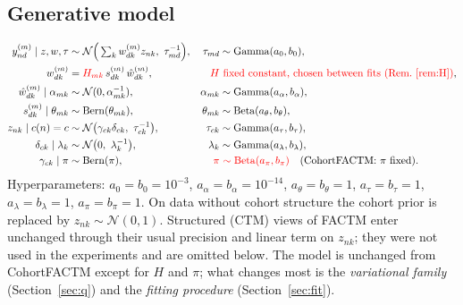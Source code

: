 \documentclass[11pt,a4paper]{article}
\newcommand{\new}[1]{{\color{red}#1}}
\newcommand{\N}{\mathcal{N}}
\newcommand{\Bern}{\mathrm{Bern}}
\newcommand{\Betad}{\mathrm{Beta}}
\newcommand{\Gam}{\mathrm{Gamma}}
\newcommand{\wh}{\hat w}
\theoremstyle{definition}
\theoremstyle{remark}
\begin{document}
\subsection{Generative model}
\begin{align}
y^{(m)}_{nd}\mid z,w,\tau &\sim \N\Big(\textstyle\sum_{k} w^{(m)}_{dk}z_{nk},\ \tau_{md}^{-1}\Big), &\tau_{md}&\sim\Gam(a_0,b_0),\label{eq:lik}\\
w^{(m)}_{dk} &= \new{H_{mk}}\, s^{(m)}_{dk}\,\wh^{(m)}_{dk}, &\new{H}&\ \new{\text{fixed constant, chosen between fits (Rem.~\ref{rem:H})}},\label{eq:w}\\
\wh^{(m)}_{dk}\mid\alpha_{mk}&\sim\N(0,\alpha_{mk}^{-1}), &\alpha_{mk}&\sim\Gam(a_\alpha,b_\alpha),\\
s^{(m)}_{dk}\mid\theta_{mk}&\sim\Bern(\theta_{mk}), &\theta_{mk}&\sim\Betad(a_\theta,b_\theta),\\
z_{nk}\mid c(n)=c &\sim \N\big(\gamma_{ck}\delta_{ck},\ \tau_{ck}^{-1}\big), &\tau_{ck}&\sim\Gam(a_\tau,b_\tau),\label{eq:z}\\
\delta_{ck}\mid\lambda_k &\sim \N\big(0,\ \lambda_k^{-1}\big), &\lambda_k&\sim\Gam(a_\lambda,b_\lambda),\label{eq:delta}\\
\gamma_{ck}\mid\pi &\sim\Bern(\pi), &\new{\pi}&\new{\ \sim\Betad(a_\pi,b_\pi)}\quad(\text{CohortFACTM: }\pi\text{ fixed}).\label{eq:gamma}
\end{align}
Hyperparameters: $a_0=b_0=10^{-3}$, $a_\alpha=b_\alpha=10^{-14}$, $a_\theta=b_\theta=1$, $a_\tau=b_\tau=1$, $a_\lambda=b_\lambda=1$,
$a_\pi=b_\pi=1$. On data without cohort structure the cohort prior is replaced by $z_{nk}\sim\N(0,1)$. Structured (CTM)
views of FACTM enter unchanged through their usual precision and linear term on $z_{nk}$; they were not used in the
experiments and are omitted below. The model is unchanged from CohortFACTM except for $H$ and $\pi$; what changes most is
the \emph{variational family} (Section~\ref{sec:q}) and the \emph{fitting procedure} (Section~\ref{sec:fit}).
\end{document}
